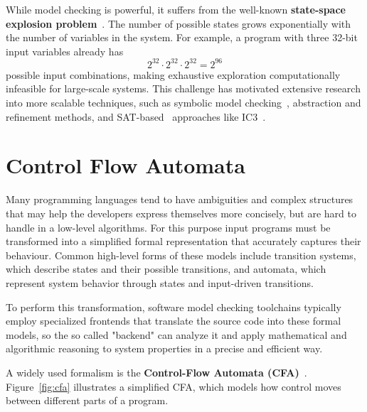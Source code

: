 While model checking is powerful, it suffers from the well-known \textbf{state-space explosion problem}~\cite{statespaceexplosionproblem}. The number of possible states grows exponentially with the number of variables in the system. For example, a program with three 32-bit input variables already has
\[
2^{32} \cdot 2^{32} \cdot 2^{32} = 2^{96}
\]
possible input combinations, making exhaustive exploration computationally infeasible for large-scale systems. This challenge has motivated extensive research into more scalable techniques, such as symbolic model checking~\cite{symbolicMC}, abstraction and refinement methods\cite{boundedMC}, and SAT-based~\cite{SMT-LIB} approaches like IC3~\cite{ic3}.

\section{Control Flow Automata}\label{sec:cfa}

Many programming languages tend to have ambiguities and complex structures that may help the developers express themselves more concisely, but are hard to handle in a low-level algorithms. For this purpose input programs must be transformed into a simplified formal representation that accurately captures their behaviour. Common high-level forms of these models include transition systems, which describe states and their possible transitions, and automata, which represent system behavior through states and input-driven transitions.

To perform this transformation, software model checking toolchains typically employ specialized frontends that translate the source code into these formal models, so the so called "backend" can analyze it and apply mathematical and algorithmic reasoning to system properties in a precise and efficient way.



 A widely used formalism is the \textbf{Control-Flow Automata (CFA)}~\cite{cfa}. Figure~\ref{fig:cfa} illustrates a simplified CFA, which models how control moves between different parts of a program.

